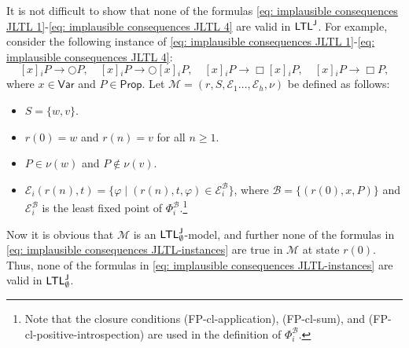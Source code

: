 \documentclass[envcountsect,envcountsame,oribibl,orivec]{llncs}
\newcommand{\Prop}{\textsf{Prop}}
\newcommand{\lnext}{\bigcirc}
\newcommand{\lalways}{\Box}
\newcommand{\JLTL}{\textsf{LTL}^{\sf J}}
\newcommand{\VTerms}{\textsf{Var}}
\newcommand{\jbox}[1]{\left[#1\right]\!}
\newcommand{\numberofagents}{h}
\newcommand{\agent}{i}
\newcommand{\evidence}{\mathcal{E}}
\newcommand{\valuation}{\nu}
\newcommand{\M}{\mathcal{M}}
\renewcommand{\phi}{\varphi}
\begin{document}
It is not difficult to show that none of the formulas \eqref{eq: implausible consequences JLTL 1}-\eqref{eq: implausible consequences JLTL 4} are valid in $\JLTL$. For example, consider the following instance of \eqref{eq: implausible consequences JLTL 1}-\eqref{eq: implausible consequences JLTL 4}:
%
\begin{equation}\label{eq: implausible consequences JLTL-instances}
	\jbox{x}_\agent P \rightarrow \lnext P, \quad
	\jbox{x}_\agent P \rightarrow \lnext\jbox{x}_\agent P, \quad
	\jbox{x}_\agent P \rightarrow \lalways \jbox{x}_\agent P, \quad
	\jbox{x}_\agent P \rightarrow \lalways P,
\end{equation}
%
where $x \in \VTerms$ and $P \in \Prop$. Let $\M = (r, S, \evidence_1\ldots,\evidence_\numberofagents, \valuation)$ be defined as follows:
%
\begin{itemize}
	\item $S = \{ w, v\}$.
	
	\item $r(0) = w$ and $r(n) = v$ for all $n \geq 1$.
	
	\item $P \in \valuation(w)$ and $P \not \in \valuation(v)$.
	
	\item $\evidence_\agent (r(n), t) = \{ \phi \mid (r(n), t, \phi) \in \evidence_\agent^\mathcal{B} \}$, where $\mathcal{B} = \{ (r(0), x, P) \}$ and $\evidence_\agent^\mathcal{B}$ is the least fixed point of $\Phi_\agent^\mathcal{B}$.\footnote{Note that the closure conditions (FP-cl-application), (FP-cl-sum), and (FP-cl-positive-introspection) are used in the definition of $\Phi_\agent^\mathcal{B}$.} 
\end{itemize}
%
Now it is obvious that $\M$ is an $\JLTL_\emptyset$-model, and further none of the formulas in \eqref{eq: implausible consequences JLTL-instances} are true in $\M$ at state $r(0)$. Thus, none of the formulas in \eqref{eq: implausible consequences JLTL-instances} are valid in $\JLTL_\emptyset$.
%


\end{document}
